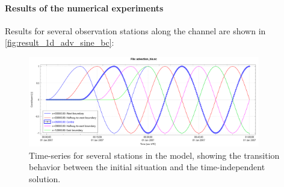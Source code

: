 \paragraph*{Results of the numerical experiments}
Results for several observation stations along the channel are shown in  \autoref{fig:result_1d_adv_sine_bc}:
\begin{figure}[H]
    \centering
    \includegraphics[width=0.9\textwidth]{figures/1d_advec_sine_dx10d0.pdf}
    \caption{Time-series for several stations in the model, showing the transition behavior between the initial situation and the time-independent solution.}
    \label{fig:result_1d_adv_sine_bc}
\end{figure}
